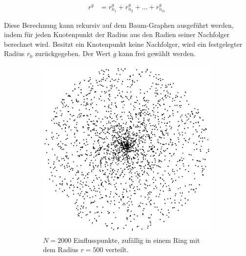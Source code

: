 \begin{equation}
\begin{array}{ll}
r^g & = r_{n_1}^g + r_{n_2}^g + ... + r_{n_m}^g 
\end{array}
\end{equation} 

Diese Berechnung kann rekursiv auf dem Baum-Graphen ausgeführt werden, indem für jeden Knotenpunkt der Radius aus den Radien seiner Nachfolger berechnet wird. Besitzt ein Knotenpunkt keine Nachfolger, wird ein festgelegter Radius $r_0$ zurückgegeben. \cite[Abschn. 3.5]{LeafVenation:05} Der Wert $g$ kann frei gewählt werden.

\begin{figure} [hbtp]
	\centering
	\begin{subfigure}[t]{.35\textwidth}
		\centering
		\includegraphics[width=\linewidth]{images/SCA_Extended1.png}
		\caption{$N=2000$ Einflusspunkte, zufällig in einem Ring mit dem Radius $r = 500$ verteilt.}
		\label{subfig:SCA_Extended1}
	\end{subfigure}
	\hspace{.1\textwidth}
	\begin{subfigure}[t]{.35\textwidth}
		\centering

\end{subfigure}
\end{figure}
